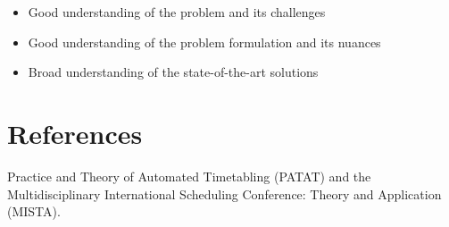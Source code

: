 \documentclass[a4paper]{report}
\begin{document}
\begin{itemize}
    \item Good understanding of the problem and its challenges
    \item Good understanding of the problem formulation and its nuances
    \item Broad understanding of the state-of-the-art solutions
\end{itemize}

\section*{References}

Practice and Theory of Automated Timetabling (PATAT) and the Multidisciplinary International Scheduling Conference: Theory and Application (MISTA).
\end{document}
